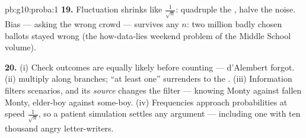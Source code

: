 \begin{solution}{pb:g10:proba:1}
\textbf{19.} Fluctuation shrinks like $\frac{1}{\sqrt n}$:
quadruple the , halve the noise. Bias --- asking the
wrong crowd --- survives any $n$: two million badly chosen
ballots stayed wrong (the how-data-lies weekend problem of the Middle School volume).

\textbf{20.} (i) Check outcomes are equally likely before
counting --- d'Alembert forgot. (ii)  multiply along
branches; ``at least one'' surrenders to the .
(iii) Information filters scenarios, and its \emph{source}
changes the filter --- knowing Monty against fallen Monty,
elder-boy against some-boy. (iv) Frequencies approach
probabilities at speed $\frac{1}{\sqrt n}$, so a patient
simulation settles any argument --- including one with ten
thousand angry letter-writers.
\end{solution}
